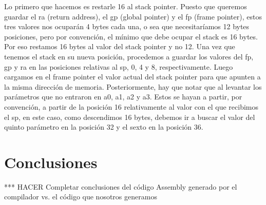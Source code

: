 \documentclass[a4paper,10pt]{article}
\begin{document}
Lo primero que hacemos es restarle 16 al stack pointer. Puesto que queremos guardar el ra (return address), el gp (global pointer) y el fp (frame pointer), estos tres valores nos ocupar\'an 4 bytes cada una, o sea que necesitar\'iamos 12 bytes posiciones, pero por convenci\'on, el m\'inimo que debe ocupar el stack es 16 bytes. Por eso restamos 16 bytes al valor del stack pointer y no 12.
Una vez que tenemos el stack en su nueva posici\'on, procedemos a guardar los valores del fp, gp y ra en las posiciones relativas al sp, 0, 4 y 8, respectivamente. Luego cargamos en el frame pointer el valor actual del stack pointer para que apunten a la misma direcci\'on de memoria.
Posteriormente, hay que notar que al levantar los par\'ametros que no entraron en a0, a1, a2 y a3. Estos se hayan a partir, por convenci\'on, a partir de la posici\'on 16 relativamente al valor con el que recibimos el sp, en este caso, como descendimos 16 bytes, debemos ir a buscar el valor del quinto par\'ametro en la posici\'on 32 y el sexto en la posici\'on 36.

\section{Conclusiones}
*** HACER
Completar conclusiones del c\'odigo Assembly generado por el compilador vs. el c\'odigo que nosotros generamos
\end{document}
